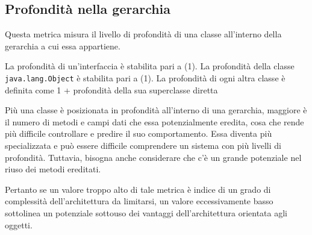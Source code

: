 \subsection{Profondità nella gerarchia}
Questa metrica misura il livello di profondità di una classe all'interno della gerarchia a cui essa appartiene. 

La profondità di un'interfaccia è stabilita pari a (1). La profondità della classe \texttt{java.lang.Object} è stabilita pari a (1). La profondità di ogni altra classe è definita come 1 + profondità della sua superclasse diretta

Più una classe è posizionata in profondità all'interno di una gerarchia, maggiore è il numero di metodi e campi dati che essa potenzialmente eredita, cosa che rende più difficile controllare e predire il suo comportamento. Essa diventa più specializzata e può essere difficile comprendere un sistema con più livelli di profondità. Tuttavia, bisogna anche considerare che c'è un grande potenziale nel riuso dei metodi ereditati.

Pertanto se un valore troppo alto di tale metrica è indice di un grado di complessità dell'architettura da limitarsi, un valore eccessivamente basso sottolinea un potenziale sottouso dei vantaggi dell'architettura orientata agli oggetti.


